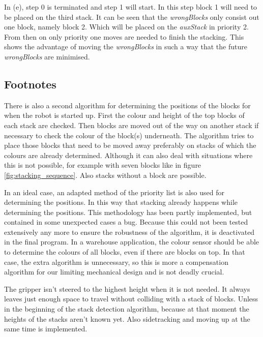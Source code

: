 \documentclass{article}
\begin{document}
	\par In (e), step 0 is terminated and step 1 will start. In this step block 1 will need to be placed on the third stack. It can be seen that the \textit{wrongBlocks} only consist out one block, namely block 2. Which will be placed on the \textit{auxStack} in priority 2. From then on only priority one moves are needed to finish the stacking. This shows the advantage of moving the \textit{wrongBlocks} in such a way that the future \textit{wrongBlocks} are minimised.
	
	\subsection{Footnotes}
	\par There is also a second algorithm for determining the positions of the blocks for when the robot is started up. First the colour and height of the top blocks of each stack are checked. Then blocks are moved out of the way on another stack if necessary to check the colour of the block(s) underneath. The algorithm tries to place those blocks that need to be moved away preferably on stacks of which the colours are already determined. Although it can also deal with situations where this is not possible, for example with seven blocks like in figure \ref{fig:stacking_sequence}. Also stacks without a block are possible.
	
	\par
	In an ideal case, an adapted method of the priority list is also used for determining the positions. In this way that stacking already happens while determining the positions. This methodology has been partly implemented, but contained in some unexpected cases a bug. Because this could not been tested extensively any more  to ensure the robustness of the algorithm, it is deactivated in the final program. In a warehouse application, the colour sensor should be able to determine the colours of all blocks, even if there are blocks on top. In that case, the extra algorithm is unnecessary, so this is more a compensation algorithm for our limiting mechanical design and is not deadly crucial.
	
	\par The gripper isn't steered to the highest height when it is not needed. It always leaves just enough space to travel without colliding with a stack of blocks. Unless in the beginning of the stack detection algorithm, because at that moment the heights of the stacks aren't known yet. Also sidetracking and moving up at the same time is implemented.
	
\end{document}
